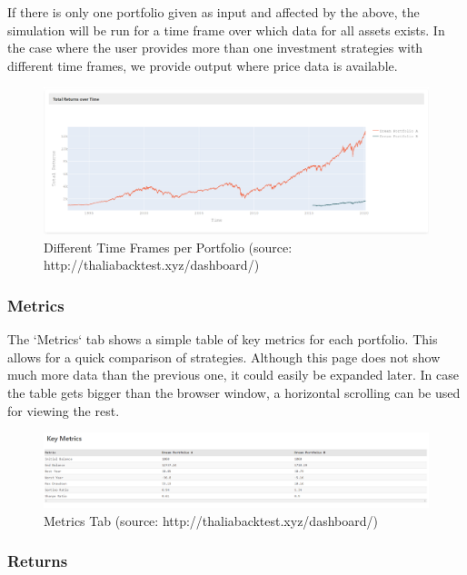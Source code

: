 \documentclass[main.tex]{subfiles}
\begin{document}
If there is only one portfolio given as input and affected by the above, the simulation will be run for a time frame over which data for all assets exists. In the case where the user provides more than one investment strategies with different time frames, we provide output where price data is available.

\begin{figure}[H]
   \centering
   \includegraphics[width=\textwidth]{08Appendices/081User/081Pictures/differences.png}
   \caption{Different Time Frames per Portfolio (source: http://thaliabacktest.xyz/dashboard/)}
\end{figure}

\subsubsection{Metrics}

The `Metrics` tab shows a simple table of key metrics for each portfolio. This allows for a quick comparison of strategies. Although this page does not show much more data than the previous one, it could easily be expanded later. In case the table gets bigger than the browser window, a horizontal scrolling can be used for viewing the rest.

\begin{figure}[H]
   \centering
   \includegraphics[width=\textwidth]{08Appendices/081User/081Pictures/metrics.png}
   \caption{Metrics Tab (source: http://thaliabacktest.xyz/dashboard/)}
   \label{metrics}
\end{figure}



\subsubsection{Returns}
\end{document}

